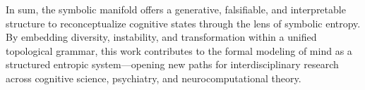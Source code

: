 In sum, the symbolic manifold offers a generative, falsifiable, and interpretable structure to reconceptualize cognitive states through the lens of symbolic entropy. By embedding diversity, instability, and transformation within a unified topological grammar, this work contributes to the formal modeling of mind as a structured entropic system—opening new paths for interdisciplinary research across cognitive science, psychiatry, and neurocomputational theory.